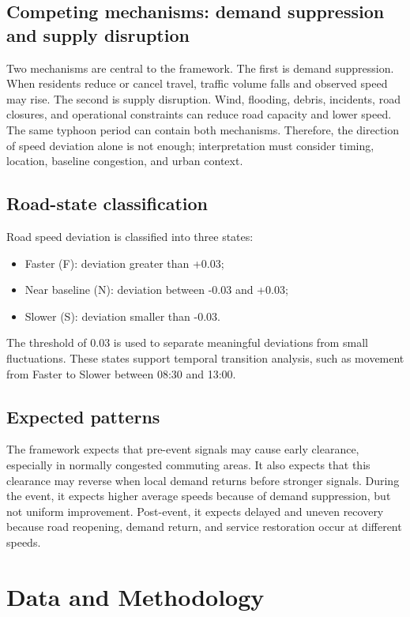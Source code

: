 \documentclass[12pt,a4paper]{report}
\begin{document}
\section{Competing mechanisms: demand suppression and supply disruption}
Two mechanisms are central to the framework. The first is demand suppression. When residents reduce or cancel travel, traffic volume falls and observed speed may rise. The second is supply disruption. Wind, flooding, debris, incidents, road closures, and operational constraints can reduce road capacity and lower speed. The same typhoon period can contain both mechanisms. Therefore, the direction of speed deviation alone is not enough; interpretation must consider timing, location, baseline congestion, and urban context.

\section{Road-state classification}
Road speed deviation is classified into three states:
\begin{itemize}
  \item Faster (F): deviation greater than +0.03;
  \item Near baseline (N): deviation between -0.03 and +0.03;
  \item Slower (S): deviation smaller than -0.03.
\end{itemize}
The threshold of 0.03 is used to separate meaningful deviations from small fluctuations. These states support temporal transition analysis, such as movement from Faster to Slower between 08:30 and 13:00.

\section{Expected patterns}
The framework expects that pre-event signals may cause early clearance, especially in normally congested commuting areas. It also expects that this clearance may reverse when local demand returns before stronger signals. During the event, it expects higher average speeds because of demand suppression, but not uniform improvement. Post-event, it expects delayed and uneven recovery because road reopening, demand return, and service restoration occur at different speeds.

\chapter{Data and Methodology}
\end{document}
